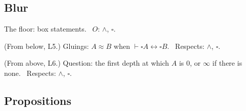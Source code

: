 \subsection*{Blur}

The floor: box statements. \ $O$: $\wedge$, $\square$.

\begin{lines}
\item[\lab{B1}] (From below, L5.) Gluings: $A \approx B$ when $\vdash \square A \leftrightarrow \square B$. \ Respects: $\wedge$, $\square$.
\item[\lab{B2}] (From above, L6.) Question: the first depth at which $A$ is $0$, or $\infty$ if there is none. \ Respects: $\wedge$, $\square$.
\end{lines}

\subsection*{Propositions}

